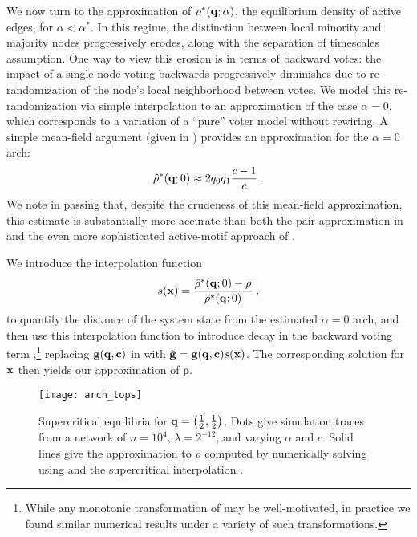 \documentclass[review, onefignum, onetabnum]{siamart171218}
\begin{document}
		We now turn to the approximation of $\rho^*(\mathbf{q};\alpha)$, the equilibrium density of active edges, for $\alpha < \alpha^*$. 
		In this regime, the distinction between local minority and majority nodes progressively erodes, along with the separation of timescales assumption. 
		One way to view this erosion is in terms of backward votes: the impact of a single node voting backwards progressively diminishes due to re-randomization of the node's local neighborhood between votes. 
		We model this re-randomization via simple interpolation to an approximation of the case $\alpha = 0$, which corresponds to a variation of a ``pure'' voter model without rewiring. 
		A simple mean-field argument (given in ) provides an approximation for the $\alpha = 0$ arch:
		\begin{align}
			\hat{\rho}^*(\q; 0) \approx 2q_0q_1\frac{c-1}{c}\;. \label{eq:alpha_0}
		\end{align}
		We note in passing that, despite the crudeness of this mean-field approximation, this estimate is substantially more accurate than both the pair approximation in \cite{Durrett2012} and the even more sophisticated active-motif approach of \cite{Demirel2012}. 

		We introduce the interpolation function 
		\begin{align}
			s(\x) = \frac{\hat{\rho}^*(\q;0) - \rho}{\hat{\rho}^*(\q;0)}\;, \label{eq:interpolation}
		\end{align}
		to quantify the distance of the system state from the estimated $\alpha = 0$ arch, and then use this interpolation function to introduce decay in the backward voting term  ,\footnote{While any monotonic transformation of   may be well-motivated, in practice we found similar numerical results under a variety of such transformations.}
		replacing $\mathbf{g}(\mathbf{q}, \mathbf{c})$ in  with $\tilde{\mathbf{g}} = \mathbf{g}(\mathbf{q}, \mathbf{c})s(\mathbf{x})$.
		The corresponding solution for $\mathbf{x}$ then yields our approximation of $\mathbf{\rho}$. 
		\begin{figure}
			\centering
				\texttt{[image: arch\_tops]}
			\caption{Supercritical equilibria for $\mathbf{q} = \left(\frac{1}{2}, \frac{1}{2}\right)$.
			Dots give simulation traces from a network of $n = 10^4$, $\lambda = 2^{-12}$, and varying $\alpha$ and $c$.
			Solid lines give the approximation to $\rho$ computed by numerically solving  using  and the supercritical interpolation .} \label{fig:arch_tops}
		\end{figure}
		
\end{document}
